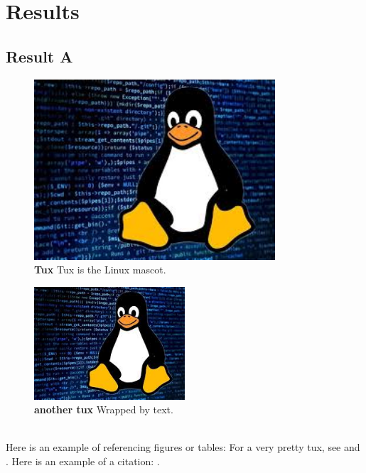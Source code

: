 \chapter[RESULTS]{Results}\label{sec:results}

\section{Result A}

\lipsum[2-8]

\begin{figure}[H]
    \centering
    \includegraphics[width=0.8\textwidth]{figures/tux.jpeg}
    \caption[\textbf{TUX}]{\textbf{Tux} Tux is the Linux mascot.}
    \label{fig:tux1}
\end{figure}

\lipsum[18-20]

\begin{figure}
\includegraphics[width=0.5\textwidth]{figures/tux.jpeg}
\caption{\textbf{another tux} Wrapped by text. }
\label{fig:tux2}
\end{figure}

\lipsum[8-9] \\

Here is an example of referencing figures or tables: For a very pretty tux, see  and .
\newline
Here is an example of a citation: \cite{janeway}.

\lipsum[8-10] \\


